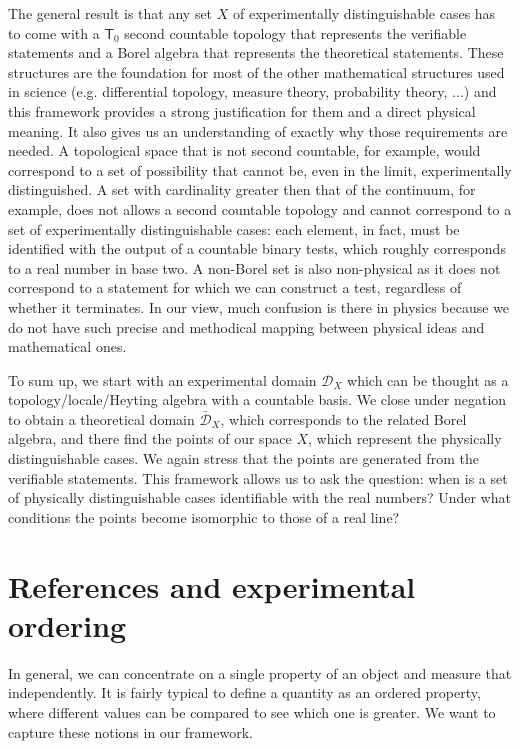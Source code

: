 \documentclass{article}
\newcommand{\edomain}[1][D] {\mathcal{#1}} %
\newcommand{\tdomain}[1][D] {\bar{\mathcal{#1}}} %
\begin{document}
The general result is that any set $X$ of experimentally distinguishable cases has to come with a $\mathsf{T}_0$ second countable topology that represents the verifiable statements and a Borel algebra that represents the theoretical statements. These structures are the foundation for most of the other mathematical structures used in science (e.g. differential topology, measure theory, probability theory, ...) and this framework provides a strong justification for them and a direct physical meaning. It also gives us an understanding of exactly why those requirements are needed. A topological space that is not second countable, for example, would correspond to a set of possibility that cannot be, even in the limit, experimentally distinguished. A set with cardinality greater then that of the continuum, for example, does not allows a second countable topology and cannot correspond to a set of experimentally distinguishable cases: each element, in fact, must be identified with the output of a countable binary tests, which roughly corresponds to a real number in base two. A non-Borel set is also non-physical as it does not correspond to a statement for which we can construct a test, regardless of whether it terminates. In our view, much confusion is there in physics because we do not have such precise and methodical mapping between physical ideas and mathematical ones.

To sum up, we start with an experimental domain $\edomain_X$ which can be thought as a topology/locale/Heyting algebra with a countable basis. We close under negation to obtain a theoretical domain $\tdomain_X$, which corresponds to the related Borel algebra, and there find the points of our space $X$, which represent the physically distinguishable cases. We again stress that the points are generated from the verifiable statements. This framework allows us to ask the question: when is a set of physically distinguishable cases identifiable with the real numbers? Under what conditions the points become isomorphic to those of a real line?

\section{References and experimental ordering}

In general, we can concentrate on a single property of an object and measure that independently. It is fairly typical to define a quantity as an ordered property, where different values can be compared to see which one is greater. We want to capture these notions in our framework.
\end{document}
